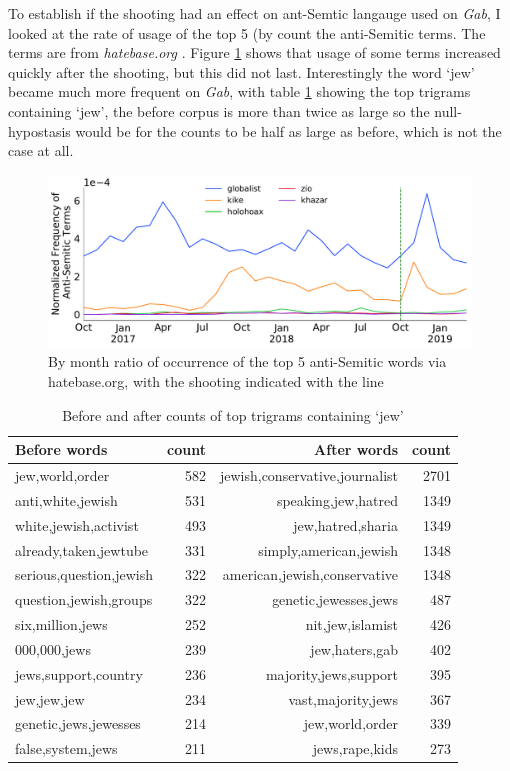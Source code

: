 \documentclass[letterpaper]{article}
\begin{document}
To establish if the shooting had an effect on ant-Semtic langauge used on \textit{Gab}, I looked at the rate of usage of the top 5 (by count the anti-Semitic terms. The terms are from \textit{hatebase.org} \cite{hatebase}. Figure \ref{top_anti} shows that usage of some terms increased quickly after the shooting, but this did not last. Interestingly the word `jew' became much more frequent on \textit{Gab}, with table \ref{jew_table} showing the top trigrams containing `jew', the before corpus is more than twice as large so the null-hypostasis would be for the counts to be half as large as before, which is not the case at all.

\begin{figure}[h!]
	\centering
	\includegraphics[width=1\textwidth]{overtime_normalized_antisem.pdf}
	\caption{By month ratio of occurrence of the top 5 anti-Semitic words via hatebase.org, with the shooting indicated with the  line}\label{top_anti}
\end{figure}

\begin{table}[h!]
	\centering
	\begin{tabular}{lrrr}
		\toprule
		Before words &count  & After words & count\\
		\midrule
		jew,world,order&582&jewish,conservative,journalist&2701\\
		anti,white,jewish&531&speaking,jew,hatred&1349\\
		white,jewish,activist&493&jew,hatred,sharia&1349\\
		already,taken,jewtube&331&simply,american,jewish&1348\\
		serious,question,jewish&322&american,jewish,conservative&1348\\
		question,jewish,groups&322&genetic,jewesses,jews&487\\
		six,million,jews&252&nit,jew,islamist&426\\
		000,000,jews&239&jew,haters,gab&402\\
		jews,support,country&236&majority,jews,support&395\\
		jew,jew,jew&234&vast,majority,jews&367\\
		genetic,jews,jewesses&214&jew,world,order&339\\
		false,system,jews&211&jews,rape,kids&273\\
		\bottomrule
	\end{tabular}
\caption{Before and after counts of top trigrams containing `jew'}\label{jew_table}
\end{table}
\end{document}
